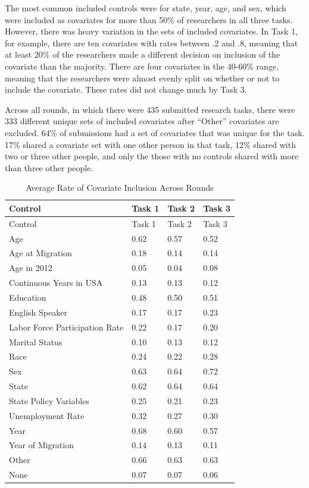 \documentclass[
  letterpaper,
  DIV=11,
  numbers=noendperiod]{scrartcl}
\begin{document}
The most common included controls were for state, year, age, and sex,
which were included as covariates for more than 50\% of researchers in
all three tasks. However, there was heavy variation in the sets of
included covariates. In Task 1, for example, there are ten covariates
with rates between .2 and .8, meaning that at least 20\% of the
researchers made a different decision on inclusion of the covariate than
the majority. There are four covariates in the 40-60\% range, meaning
that the researchers were almost evenly split on whether or not to
include the covariate. These rates did not change much by Task 3.

Across all rounds, in which there were 435 submitted research tasks,
there were 333 different unique sets of included covariates after
``Other'' covariates are excluded. 64\% of submissions had a set of
covariates that was unique for the task. 17\% shared a covariate set
with one other person in that task, 12\% shared with two or three other
people, and only the those with no controls shared with more than three
other people.

\begin{longtable}[]{@{}llll@{}}
\caption{Average Rate of Covariate Inclusion Across Rounds
\label{tab-controls-across-rounds}}\tabularnewline
\toprule\noalign{}
Control & Task 1 & Task 2 & Task 3 \\
\midrule\noalign{}
\endfirsthead
\toprule\noalign{}
Control & Task 1 & Task 2 & Task 3 \\
\midrule\noalign{}
\endhead
\bottomrule\noalign{}
\endlastfoot
Age & 0.62 & 0.57 & 0.52 \\
Age at Migration & 0.18 & 0.14 & 0.14 \\
Age in 2012 & 0.05 & 0.04 & 0.08 \\
Continuous Years in USA & 0.13 & 0.13 & 0.12 \\
Education & 0.48 & 0.50 & 0.51 \\
English Speaker & 0.17 & 0.17 & 0.23 \\
Labor Force Participation Rate & 0.22 & 0.17 & 0.20 \\
Marital Status & 0.10 & 0.13 & 0.12 \\
Race & 0.24 & 0.22 & 0.28 \\
Sex & 0.63 & 0.64 & 0.72 \\
State & 0.62 & 0.64 & 0.64 \\
State Policy Variables & 0.25 & 0.21 & 0.23 \\
Unemployment Rate & 0.32 & 0.27 & 0.30 \\
Year & 0.68 & 0.60 & 0.57 \\
Year of Migration & 0.14 & 0.13 & 0.11 \\
Other & 0.66 & 0.63 & 0.63 \\
None & 0.07 & 0.07 & 0.06 \\
\end{longtable}
\end{document}
